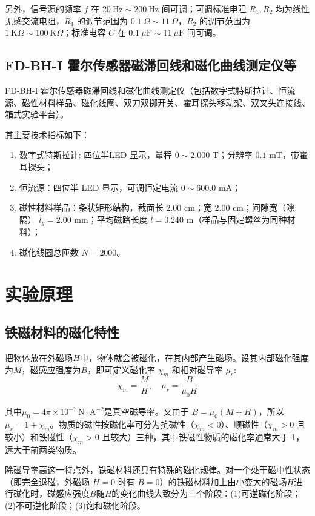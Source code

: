 \documentclass[UTF8]{article}
\def\kO{\ \mathrm{K}\Omega}
\def\uF{\ \mu\mathrm{F}}
\theoremstyle{MyLineTheoremStyle} %
\theoremstyle{MyBlockTheoremStyle} %
\theoremstyle{MySubsubsectionStyle} %
\begin{document}
另外，信号源的频率 $f$ 在 $ 20\ \mathrm{Hz} \sim 200\ \mathrm{Hz} $ 间可调；可调标准电阻 $ R_1,R_2 $ 均为线性无感交流电阻，$ R_1 $ 的调节范围为 $ 0.1 \ \Omega \sim 11\ \Omega $，$ R_2 $ 的调节范围为 $ 1 \kO \sim 100 \kO $；标准电容 $C$ 在 $ 0.1 \uF \sim 11 \uF $ 间可调。

\subsection{FD-BH-I 霍尔传感器磁滞回线和磁化曲线测定仪等}

FD-BH-I 霍尔传感器磁滞回线和磁化曲线测定仪（包括数字式特斯拉计、恒流源、磁性材料样品、磁化线圈、双刀双掷开关、霍耳探头移动架、双叉头连接线、箱式实验平台）。

其主要技术指标如下：
\begin{enumerate}
\item 数字式特斯拉计: 四位半LED 显示，量程 $0 \sim 2.000 $ T；分辨率 $0.1$ mT，带霍耳探头；
\item 恒流源：四位半 LED 显示，可调恒定电流 $0\sim 600.0$ mA；
\item 磁性材料样品：条状矩形结构，截面长 $2.00$ cm；宽 $2.00$ cm；间隙宽（隙隔） $l_g = 2.00$ mm；平均磁路长度 $l =0.240$ m（样品与固定螺丝为同种材料）；
\item 磁化线圈总匝数 $N=2000$。
\end{enumerate}



\section{实验原理}
\subsection{铁磁材料的磁化特性}
把物体放在外磁场$ H $中，物体就会被磁化，在其内部产生磁场。设其内部磁化强度为$ M $，磁感应强度为$ B $，即可定义磁化率 $ \chi_m $ 和相对磁导率 $ \mu_r $: 
\begin{equation}
    \chi_m=\frac MH,\quad \mu_r=\frac{B}{\mu_0 H}
\end{equation}

其中$ \mu_0=4\pi\times10^{-7}\,\mathrm{N\cdot A^{-2}} $是真空磁导率。又由于 $ B=\mu_0(M+H) $，所以 $ \mu_r=1+\chi_m $。物质的磁性按磁化率可分为抗磁性（$\chi_m < 0$）、顺磁性（$\chi_m > 0$ 且较小）和铁磁性（$\chi_m >0$ 且较大）三种，其中铁磁性物质的磁化率通常大于 1，远大于前两类物质。

除磁导率高这一特点外，铁磁材料还具有特殊的磁化规律。对一个处于磁中性状态（即完全退磁，外磁场 $H=0$ 时有 $B = 0$）的铁磁材料加上由小变大的磁场$ H $进行磁化时，磁感应强度$ B $随$ H $的变化曲线大致分为三个阶段：(1)可逆磁化阶段；(2)不可逆化阶段；(3)饱和磁化阶段。
\end{document}
